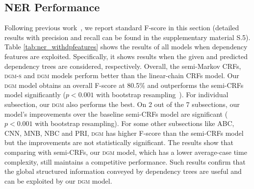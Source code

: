 \subsection{NER Performance}
Following previous work~\cite{finkel2009joint}, we report standard  F-score in this section (detailed results with precision and recall can be found in the supplementary material S.5). 
Table \ref{tab:ner_withdpfeatures} shows the results of all models when  dependency features are exploited.
Specifically, it shows results when the given and predicted dependency trees are considered, respectively.
Overall, the semi-Markov CRFs, \textsc{dgm-s} and \textsc{dgm} models perform better than the linear-chain CRFs model. 
Our \textsc{dgm} model obtains an overall F-score at 80.5\%  and outperforms the semi-CRFs model significantly ($p<0.001$ with bootstrap resampling~\cite{koehn2004statistical}).
For individual subsection, our \textsc{dgm} also performs the best.
On 2 out of the 7 subsections, our model's improvements over the baseline semi-CRFs model are significant ($p<0.001$ with bootstrap resampling).
For some other subsections like ABC, CNN, MNB, NBC and PRI, \textsc{dgm} has higher F-score than the semi-CRFs model but the improvements are not statistically significant.
The results show that comparing with  semi-CRFs, our \textsc{dgm} model, which has a lower average-case time complexity, still maintains a competitive performance. 
Such results confirm that the global structured information conveyed by dependency trees are useful and can be exploited by our \textsc{dgm} model.

